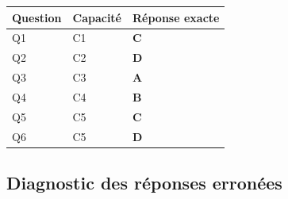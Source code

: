 \begin{center}
\begin{tabular}{lll}
\hline
Question & Capacité & Réponse exacte \\
\hline
Q1 & C1 & \textbf{C} \\
Q2 & C2 & \textbf{D} \\
Q3 & C3 & \textbf{A} \\
Q4 & C4 & \textbf{B} \\
Q5 & C5 & \textbf{C} \\
Q6 & C5 & \textbf{D} \\
\hline
\end{tabular}
\end{center}

\subsection*{Diagnostic des réponses erronées}

